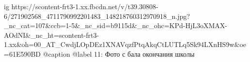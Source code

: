  
 
 
 
 

\ifcmt
  ig https://scontent-frt3-1.xx.fbcdn.net/v/t39.30808-6/271902568_4711790992201483_148218760312970918_n.jpg?_nc_cat=107&ccb=1-5&_nc_sid=b9115d&_nc_ohc=KPd-HjL3oXMAX-AOdNI&_nc_ht=scontent-frt3-1.xx&oh=00_AT_CwdjLOpDEz1XNAVqzfPtqAkqCtLUTLq5Sk94LXnHS9w&oe=61E590BD
  @caption @label 11: Фото с бала окончания школы
\fi
